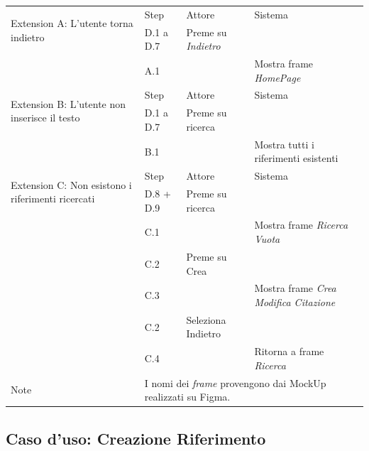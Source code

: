 \begin{table}[H]
    \def\arraystretch{1.5}
    \begin{tabularx}{\linewidth}{|l|X|X|X|}
        
 \hline \multirow{2}{*}{Extension A:  L'utente torna indietro} & Step &
  Attore & Sistema \\
 \cline{2-4} & D.1 a D.7 & Preme su \textit{Indietro} & \\
 \cline{2-4} &  A.1 &  & Mostra frame \textit{HomePage} \\
 \hline
  \multirow{2}{*}{Extension B: L'utente non inserisce il testo} & Step & Attore & Sistema \\

  \cline{2-4} & D.1 a D.7 & Preme su ricerca & \\
  \cline{2-4} & B.1 &  & Mostra tutti i riferimenti esistenti \\
 \hline
  \multirow{2}{*}{Extension C: Non esistono i riferimenti ricercati} & Step & Attore & Sistema \\

  \cline{2-4} & D.8 + D.9 & Preme su ricerca & \\
  \cline{2-4} & C.1  &  & Mostra frame \textit{Ricerca Vuota} \\
  \cline{2-4} & C.2  & Preme su Crea &  \\
  \cline{2-4} & C.3  & & Mostra frame \textit{Crea Modifica Citazione}  \\
  \cline{2-4} & C.2  & Seleziona Indietro &  \\
  \cline{2-4} & C.4  & & Ritorna a frame \textit{Ricerca}  \\

 \hline Note & \multicolumn{3}{l|}{I nomi dei \textit{frame} provengono dai MockUp realizzati su Figma.} \\
 \hline


\end{tabularx}

\end{table}

\newpage
\raggedright{\subsection{Caso d'uso: Creazione Riferimento}}


